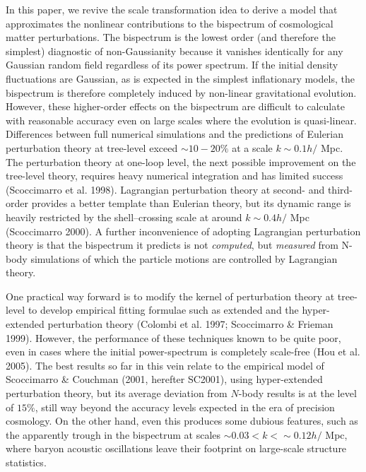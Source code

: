\documentclass[]{mn2e}
\begin{document}
In this paper, we revive the scale transformation idea to derive a
model that approximates the nonlinear contributions to the
bispectrum of cosmological matter perturbations. The bispectrum is
the lowest order (and therefore the simplest) diagnostic of
non-Gaussianity because it vanishes identically for any Gaussian
random field regardless of its power spectrum. If the initial
density fluctuations are Gaussian, as is expected in the simplest
inflationary models, the bispectrum is therefore completely induced
by non-linear gravitational evolution. However, these higher-order
effects on the bispectrum are difficult to calculate with reasonable
accuracy even on large scales where the evolution is quasi-linear.
Differences between full numerical simulations and the predictions
of  Eulerian perturbation theory at tree-level exceed $\sim 10-20\%$
at a scale $k \sim 0.1h/$ Mpc. The perturbation theory at one-loop
level, the next possible improvement on the tree-level theory,
requires heavy numerical integration and has limited success
(Scoccimarro et al. 1998). Lagrangian perturbation theory at second-
and third-order provides a better template than Eulerian theory, but
its dynamic range is heavily restricted by the shell--crossing scale
at around $k\sim 0.4h/$ Mpc (Scoccimarro 2000). A further
inconvenience of adopting Lagrangian perturbation theory is that the
bispectrum it predicts is not {\em computed}, but {\em measured}
from N-body simulations of which the particle motions are controlled
by Lagrangian theory.

One practical way forward is to modify the kernel of perturbation
theory at tree-level to develop empirical fitting formulae such as
 extended and the hyper-extended perturbation theory (Colombi et al.
 1997; Scoccimarro \& Frieman 1999). However, the performance of
 these techniques known to be quite poor, even in cases where the initial power-spectrum is completely
scale-free (Hou et al. 2005). The best results so far in this vein
relate to the empirical model of Scoccimarro \& Couchman (2001,
herefter SC2001), using hyper-extended perturbation theory, but its
average deviation from $N$-body results is at the level of $15\%$,
still way beyond the accuracy levels expected in the era of
precision cosmology. On the other hand, even this produces some
dubious features, such as the apparently trough in the bispectrum at
scales $\sim 0.03<k<\sim 0.12h/$ Mpc, where baryon acoustic
oscillations leave their footprint on large-scale structure
statistics.
\end{document}
